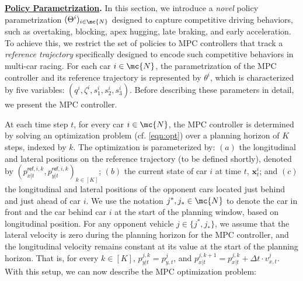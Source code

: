 \vspace{1mm}
\noindent 
\textbf{\underline{Policy Parametrization}.} In this section, we introduce a \emph{novel} policy parametrization \((\Theta^i)_{i\in\mc{N}}\) designed to capture competitive driving behaviors, such as overtaking, blocking, apex hugging, late braking, and early acceleration. To achieve this, we restrict the set of policies to MPC controllers that track a \textit{reference trajectory} specifically designed to encode such competitive behaviors in multi-car racing. For each car \(i \in \mc{N}\), the parametrization of the MPC controller and its reference trajectory is represented by \(\theta^i\), which is characterized by five variables: \((q^i, \zeta^i, s_1^i, s_2^i, s_3^i)\). Before describing these parameters in detail, we present the MPC controller.


At each time step \(t\), for every car \(i \in \mc{N}\), the MPC controller is determined by solving an optimization problem (cf. \eqref{eqn:opt}) over a planning horizon of \(K\) steps, indexed by \(k\). The optimization is parameterized by: \((a)\) the longitudinal and lateral positions on the reference trajectory (to be defined shortly), denoted by \((p_{x|t}^{\textsf{ref},i,k},p_{y|t}^{\textsf{ref},i,k})_{k\in [K]}\); \((b)\) the current state of car \(i\) at time \(t\), \(\mathbf{x}_t^i\); and \((c)\) the longitudinal and lateral positions of the opponent cars located just behind and just ahead of car \(i\). We use the notation \(j^\ast, j_\ast \in \mc{N}\) to denote the car in front and the car behind car \(i\) at the start of the planning window, based on longitudinal position. For any opponent vehicle \( j \in \{ j^\ast, j_\ast \} \), we assume that the lateral velocity is zero during the planning horizon for the MPC controller, and the longitudinal velocity remains constant at its value at the start of the planning horizon. That is, for every \(k\in [K]\), \(p_{y|t}^{j,k} = p_{y,t}^{j}\), and \(p_{x|t}^{j,k+1} = p_{x|t}^{j,k} + \Delta t \cdot v_{x,t}^{j}\).
With this setup, we can now describe the MPC optimization problem:
\vspace{-0.2cm}

